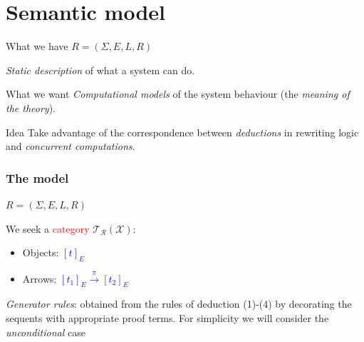\documentclass{beamer}
\begin{document}
\section{Semantic model}
\begin{frame}
    \begin{block}{What we have}
    $ R = (\Sigma, E, L, R)$

    \emph{Static description} of what a system can do.
        
    \end{block}
    
    \pause

    \begin{block}{What we want}
        \emph{Computational models} of the system behaviour (the \emph{meaning of the theory}).
    \end{block}

    \pause

    \begin{block}{Idea}
        Take advantage of the correspondence between  \emph{deductions} in rewriting logic 
        and \emph{concurrent computations}.
    \end{block}
\end{frame}
\begin{frame}
    \frametitle{The model }
    $
    R = (\Sigma, E, L, R)
    $

    \pause 
    \bigskip
    We seek a \textcolor{red}{category} $\mathcal{T_R(X)}$:\begin{itemize}
        \item Objects: \textcolor{blue}{$[t]_E$}
        \item Arrows: \textcolor{blue}{$[t_1]_E \xrightarrow{\pi} [t_2]_E$}
    \end{itemize}

    \pause 
    \bigskip
    \emph{Generator rules}: obtained from the rules of deduction (1)-(4) by decorating 
    the sequents with appropriate proof terms.
For simplicity we will consider the \emph{unconditional} case
\end{frame}
\end{document}

